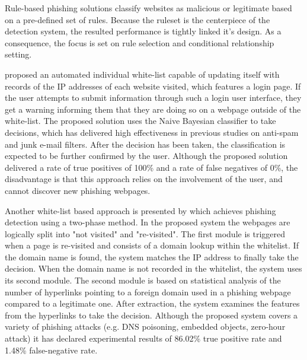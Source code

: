 
Rule-based phishing solutions classify websites as malicious or legitimate based
on a pre-defined set of rules. Because the ruleset is the centerpiece of the
detection system, the resulted performance is tightly linked it's design. As a consequence, the focus is set on rule selection and conditional relationship setting.

\cite{ANTIPHISHING_AUTOMATED_WHITELIST} proposed an automated individual
white-list capable of updating itself with records of the IP addresses of each
website visited, which features a login page. If the user attempts to submit
information through such a login user interface, they get a warning
informing them that they are doing so on a webpage outside of the white-list.
The proposed solution uses the Naive Bayesian classifier to take decisions, which
has delivered high effectiveness in previous studies on anti-spam
\citep{BAESYAN_KEYWORD_COMPARISON} and junk e-mail
\citep{BAESYAN_JUNK_FILTERING} filters. After the decision has been taken, the
classification is expected to be further confirmed by the user. Although the
proposed solution delivered a rate of true positives of 100\% and a rate of
false negatives of 0\%, the disadvantage is that this approach relies on the
involvement of the user, and cannot discover new phishing webpages.

Another white-list based approach is presented by
\cite{ANTIPHISHING_AUTOUPDATED_WHITELIST} which achieves phishing detection
using a two-phase method. In the proposed system the webpages are logically
split into "not visited" and "re-visited". The first module is triggered when a
page is re-visited and consists of a domain lookup within the whitelist. If the
domain name is found, the system matches the IP address to finally take the
decision. When the domain name is not recorded in the whitelist, the system uses
its second module. The second module is based on statistical analysis of the
number of hyperlinks pointing to a foreign domain used in a phishing webpage
compared to a legitimate one. After extraction, the system examines the features
from the hyperlinks to take the decision. Although the proposed system covers a
variety of phishing attacks (e.g. DNS poisoning, embedded objects, zero-hour
attack) it has declared experimental results of 86.02\% true positive rate and
1.48\% false-negative rate.

